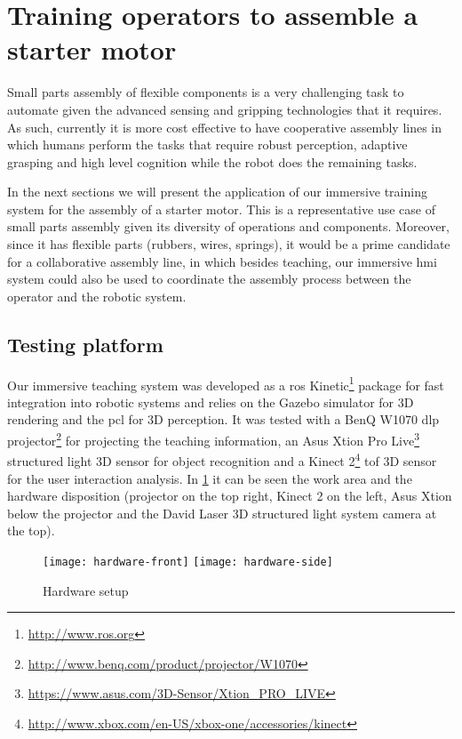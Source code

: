 \section{Training operators to assemble a starter motor}\label{sec:results}

Small parts assembly of flexible components is a very challenging task to automate given the advanced sensing and gripping technologies that it requires. As such, currently it is more cost effective to have cooperative assembly lines in which humans perform the tasks that require robust perception, adaptive grasping and high level cognition while the robot does the remaining tasks.

In the next sections we will present the application of our immersive training system for the assembly of a starter motor. This is a representative use case of small parts assembly given its diversity of operations and components. Moreover, since it has flexible parts (rubbers, wires, springs), it would be a prime candidate for a collaborative assembly line, in which besides teaching, our immersive \gls{hmi} system could also be used to coordinate the assembly process between the operator and the robotic system.



\subsection{Testing platform}

Our immersive teaching system was developed as a \gls{ros} Kinetic\footnote{\url{http://www.ros.org}} package for fast integration into robotic systems and relies on the Gazebo simulator for 3D rendering and the \gls{pcl} for 3D perception. It was tested with a BenQ W1070 \gls{dlp} projector\footnote{\url{http://www.benq.com/product/projector/W1070}} for projecting the teaching information, an Asus Xtion Pro Live\footnote{\url{https://www.asus.com/3D-Sensor/Xtion_PRO_LIVE}} structured light 3D sensor for object recognition and a Kinect 2\footnote{\url{http://www.xbox.com/en-US/xbox-one/accessories/kinect}} \gls{tof} 3D sensor for the user interaction analysis. In \cref{fig:hardware} it can be seen the work area and the hardware disposition (projector on the top right, Kinect 2 on the left, Asus Xtion below the projector and the David Laser 3D structured light system camera at the top).

\begin{figure}[ht]
	\centering
	\texttt{[image: hardware-front]}
	\texttt{[image: hardware-side]}
	\caption{Hardware setup}
	\label{fig:hardware}
\end{figure}




